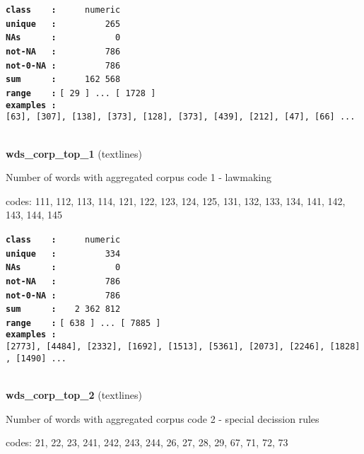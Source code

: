 \documentclass[]{article}
\begin{document}
\textbf{\texttt{class\ \ \ \ :}} \texttt{~~~~~numeric}\\
\textbf{\texttt{unique\ \ \ :}} \texttt{~~~~~~~~~265}\\
\textbf{\texttt{NAs\ \ \ \ \ \ :}} \texttt{~~~~~~~~~~~0}\\
\textbf{\texttt{not-NA\ \ \ :}} \texttt{~~~~~~~~~786}\\
\textbf{\texttt{not-0-NA\ :}} \texttt{~~~~~~~~~786}\\
\textbf{\texttt{sum\ \ \ \ \ \ :}} \texttt{~~~~~162~568}\\
\textbf{\texttt{range\ \ \ \ :}}
\texttt{{[}\ 29\ {]}\ ...\ {[}\ 1728\ {]}}\\
\textbf{\texttt{examples\ :}}
\texttt{{[}63{]},\ {[}307{]},\ {[}138{]},\ {[}373{]},\ {[}128{]},\ {[}373{]},\ {[}439{]},\ {[}212{]},\ {[}47{]},\ {[}66{]}\ ...}\\

~

\textbf{wds\_corp\_top\_1} (textlines)

Number of words with aggregated corpus code 1 - lawmaking

codes: 111, 112, 113, 114, 121, 122, 123, 124, 125, 131, 132, 133, 134,
141, 142, 143, 144, 145

\textbf{\texttt{class\ \ \ \ :}} \texttt{~~~~~numeric}\\
\textbf{\texttt{unique\ \ \ :}} \texttt{~~~~~~~~~334}\\
\textbf{\texttt{NAs\ \ \ \ \ \ :}} \texttt{~~~~~~~~~~~0}\\
\textbf{\texttt{not-NA\ \ \ :}} \texttt{~~~~~~~~~786}\\
\textbf{\texttt{not-0-NA\ :}} \texttt{~~~~~~~~~786}\\
\textbf{\texttt{sum\ \ \ \ \ \ :}} \texttt{~~~2~362~812}\\
\textbf{\texttt{range\ \ \ \ :}}
\texttt{{[}\ 638\ {]}\ ...\ {[}\ 7885\ {]}}\\
\textbf{\texttt{examples\ :}}
\texttt{{[}2773{]},\ {[}4484{]},\ {[}2332{]},\ {[}1692{]},\ {[}1513{]},\ {[}5361{]},\ {[}2073{]},\ {[}2246{]},\ {[}1828{]},\ {[}1490{]}\ ...}\\

~

\textbf{wds\_corp\_top\_2} (textlines)

Number of words with aggregated corpus code 2 - special decission rules

codes: 21, 22, 23, 241, 242, 243, 244, 26, 27, 28, 29, 67, 71, 72, 73
\end{document}
